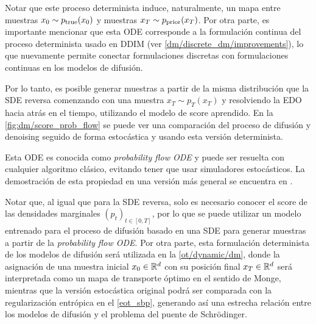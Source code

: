 Notar que este proceso determinista induce, naturalmente, un mapa  entre muestras $x_0\sim p_{\operatorname{true}}(x_0)$ y muestras $x_T\sim p_{\operatorname{prior}}(x_T)$. Por otra parte, es importante mencionar que esta ODE corresponde a la formulación continua del proceso determinista usado en DDIM (ver \autoref{dm/discrete_dm/improvements}), lo que nuevamente permite conectar formulaciones discretas con formulaciones continuas en los modelos de difusión.

Por lo tanto, es posible generar muestras a partir de la misma distribución que la SDE reversa comenzando con una muestra $x_T\sim p_T(x_T)$ y resolviendo la EDO hacia atrás en el tiempo, utilizando el modelo de score aprendido. En la \autoref{fig:dm/score_prob_flow} se puede ver una comparación del proceso de difusión y denoising seguido de forma estocástica y usando esta versión determinista.


Esta ODE es conocida como \textit{probability flow ODE} y puede ser resuelta con cualquier algoritmo clásico, evitando tener que usar simuladores estocásticos. La demostración de esta propiedad en una versión más general se encuentra en \cite{song2021scorebased}.

Notar que, al igual que para la SDE reversa, solo es necesario conocer el score de las densidades marginales $(p_t)_{t\in[0,T]}$, por lo que se puede utilizar un modelo entrenado para el proceso de difusión basado en una SDE para generar muestras a partir de la \textit{probability flow ODE}. Por otra parte, esta formulación determinista de los modelos de difusión será utilizada en la \autoref{ot/dynamic/dm}, donde la asignación de una muestra inicial $x_0\in\mathbb{R}^d$ con su posición final $x_T\in\mathbb{R}^d$ será interpretada como un mapa de transporte óptimo en el sentido de Monge, mientras que la versión estocástica original podrá ser comparada con la regularización entrópica en el \autoref{eot_sbp}, generando así una estrecha relación entre los modelos de difusión y el problema del puente de Schrödinger.



